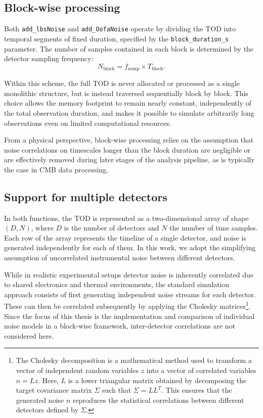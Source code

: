 \subsection{Block-wise processing}

Both \texttt{add\_lbsNoise} and \texttt{add\_OofaNoise} operate by dividing the TOD into temporal segments of fixed duration, specified by the \texttt{block\_duration\_s} parameter. The number of samples contained in each block is determined by the detector sampling frequency:
\[
N_{\text{block}} = f_{\text{samp}} \times T_{\text{block}}.
\]

Within this scheme, the full TOD is never allocated or processed as a single monolithic structure, but is instead traversed sequentially block by block. This choice allows the memory footprint to remain nearly constant, independently of the total observation duration, and makes it possible to simulate arbitrarily long observations even on limited computational resources.

From a physical perspective, block-wise processing relies on the assumption that noise correlations on timescales longer than the block duration are negligible or are effectively removed during later stages of the analysis pipeline, as is typically the case in CMB data processing. 


\subsection{Support for multiple detectors}
In both functions, the TOD is represented as a two-dimensional array of shape $(D, N)$, where $D$ is the number of detectors and $N$ the number of time samples. Each row of the array represents the timeline of a single detector, and noise is generated independently for each of them. In this work, we adopt the simplifying assumption of uncorrelated instrumental noise between different detectors. 

While in realistic experimental setups detector noise is inherently correlated due to shared electronics and thermal environments, the standard simulation approach consists of first generating independent noise streams for each detector. These can then be correlated subsequently by applying the Cholesky matrices\footnote{The Cholesky decomposition is a mathematical method used to transform a vector of independent random variables $z$ into a vector of correlated variables $n = Lz$. Here, $L$ is a lower triangular matrix obtained by decomposing the target covariance matrix $\Sigma$ such that $\Sigma = LL^T$. This ensures that the generated noise $n$ reproduces the statistical correlations between different detectors defined by $\Sigma$.}. Since the focus of this thesis is the implementation and comparison of individual noise models in a block-wise framework, inter-detector correlations are not considered here.

